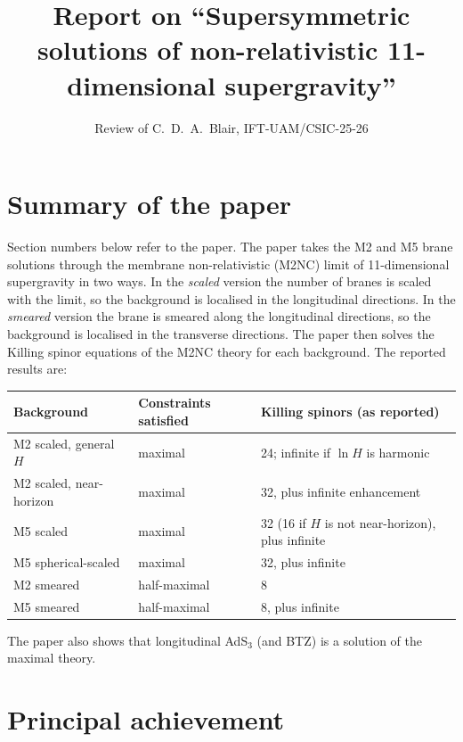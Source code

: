 \documentclass[11pt]{article}
\title{Report on ``Supersymmetric solutions of non-relativistic 11-dimensional supergravity''}
\author{Review of C.~D.~A.~Blair, IFT-UAM/CSIC-25-26}
\date{}
\begin{document}
\maketitle

\section*{Summary of the paper}

Section numbers below refer to the paper. The paper takes the M2 and M5 brane solutions through the membrane non-relativistic (M2NC) limit of 11-dimensional supergravity in two ways. In the \emph{scaled} version the number of branes is scaled with the limit, so the background is localised in the longitudinal directions. In the \emph{smeared} version the brane is smeared along the longitudinal directions, so the background is localised in the transverse directions. The paper then solves the Killing spinor equations of the M2NC theory for each background. The reported results are:

\begin{center}
\small
\begin{tabular}{lll}
\toprule
Background & Constraints satisfied & Killing spinors (as reported) \\
\midrule
M2 scaled, general $H$ & maximal & 24; infinite if $\ln H$ is harmonic \\
M2 scaled, near-horizon & maximal & 32, plus infinite enhancement \\
M5 scaled & maximal & 32 (16 if $H$ is not near-horizon), plus infinite \\
M5 spherical-scaled & maximal & 32, plus infinite \\
M2 smeared & half-maximal & 8 \\
M5 smeared & half-maximal & 8, plus infinite \\
\bottomrule
\end{tabular}
\end{center}

The paper also shows that longitudinal AdS$_3$ (and BTZ) is a solution of the maximal theory.

\section{Principal achievement}
\end{document}
